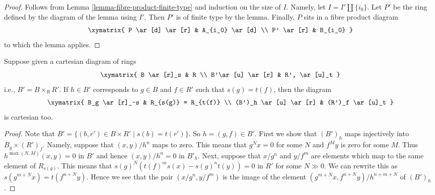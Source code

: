 \begin{proof}
Follows from Lemma \ref{lemma-fibre-product-finite-type}
and induction on the size of $I$.
Namely, let $I = I' \amalg \{i_0\}$. Let $P'$ be the ring defined
by the diagram of the lemma using $I'$. Then $P'$ is of finite type
by the lemma. Finally, $P$ sits in a fibre product diagram
$$
\xymatrix{
P \ar[d] \ar[r] & A_{i_0} \ar[d] \\
P' \ar[r] & B_{i_0}
}
$$
to which the lemma applies.
\end{proof}

\begin{lemma}
\label{lemma-diagram-localize}
Suppose given a cartesian diagram of rings
$$
\xymatrix{
B \ar[r]_s & R \\
B'\ar[u] \ar[r] & R', \ar[u]_t
}
$$
i.e., $B' = B \times_R R'$. If $h \in B'$ corresponds to $g \in B$
and $f \in R'$ such that $s(g) = t(f)$, then the diagram
$$
\xymatrix{
B_g \ar[r]_-s & R_{s(g)} = R_{t(f)} \\
(B')_h \ar[u] \ar[r] & (R')_f \ar[u]_t
}
$$
is cartesian too.
\end{lemma}

\begin{proof}
Note that $B' = \{(b, r') \in B \times R' \mid s(b) = t(r')\}$.
So $h = (g, f) \in B'$. First we show that $(B')_h$ maps
injectively into $B_g \times (R')_f$. Namely, suppose that
$(x, y)/h^n$ maps to zero. This means that
$g^Nx = 0$ for some $N$ and $f^My$ is zero for some $M$.
Thus $h^{\max(N, M)}(x, y) = 0$ in $B'$ and hence $(x, y)/h^n = 0$
in $B'_h$.
Next, suppose that $x/g^n$ and $y/f^m$ are elements
which map to the same element of $R_{s(g)}$.
This means that $s(g)^N(t(f)^ms(x) - s(g)^nt(y)) = 0$ in $R'$
for some $N \gg 0$. We can rewrite this as
$s(g^{m + N}x) = t(f^{n + N}y)$. Hence we see that the
pair $(x/g^n, y/f^m)$ is the image of the element
$(g^{m + N}x, f^{n + N}y)/h^{n + m + N}$ of
$(B')_h$.
\end{proof}

